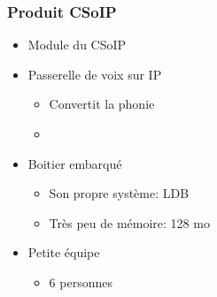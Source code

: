 \begin{frame}
    \frametitle{Produit CSoIP}
    \begin{itemize}
        \item Module du CSoIP
        \item Passerelle de voix sur IP
        \begin{itemize}
            \item Convertit la phonie
            \item 
        \end{itemize}
        \item Boitier embarqué
            \begin{itemize}
                \item Son propre système: LDB
                \item Très peu de mémoire: 128 mo
            \end{itemize}
        \item Petite équipe
            \begin{itemize}
                \item 6 personnes
            \end{itemize}
    \end{itemize}
\end{frame}